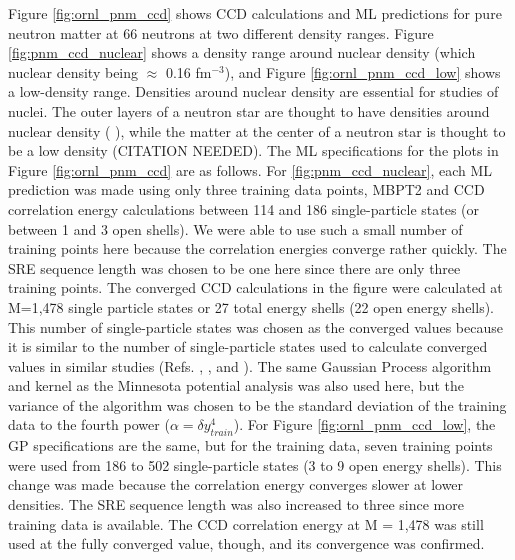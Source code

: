 Figure \ref{fig:ornl_pnm_ccd} shows CCD calculations and ML predictions for pure neutron matter at 66 neutrons at two different density ranges. Figure \ref{fig:pnm_ccd_nuclear} shows a density range around nuclear density (which nuclear density being $\approx$ 0.16 fm$^{-3}$), and Figure \ref{fig:ornl_pnm_ccd_low} shows a low-density range. Densities around nuclear density are essential for studies of nuclei. The outer layers of a neutron star are thought to have densities around nuclear density (\cite{Ref3} \cite{Ref9} \cite{Ref16}), while the matter at the center of a neutron star is thought to be a low density (CITATION NEEDED). The ML specifications for the plots in Figure \ref{fig:ornl_pnm_ccd} are as follows. For \ref{fig:pnm_ccd_nuclear}, each ML prediction was made using only three training data points, MBPT2 and CCD correlation energy calculations between 114 and 186 single-particle states (or between 1 and 3 open shells). We were able to use such a small number of training points here because the correlation energies converge rather quickly. The SRE sequence length was chosen to be one here since there are only three training points. The converged CCD calculations in the figure were calculated at M=1,478 single particle states or 27 total energy shells (22 open energy shells). This number of single-particle states was chosen as the converged values because it is similar to the number of single-particle states used to calculate converged values in similar studies (Refs. \cite{Ref8}, \cite{Ref9}, and \cite{Ref20}). The same Gaussian Process algorithm and kernel as the Minnesota potential analysis was also used here, but the variance of the algorithm was chosen to be the standard deviation of the training data to the fourth power ($\alpha = \delta y_{train}^{4}$). For Figure \ref{fig:ornl_pnm_ccd_low}, the GP specifications are the same, but for the training data, seven training points were used from 186 to 502 single-particle states (3 to 9 open energy shells). This change was made because the correlation energy converges slower at lower densities. The SRE sequence length was also increased to three since more training data is available. The CCD correlation energy at M = 1,478 was still used at the fully converged value, though, and its convergence was confirmed.

